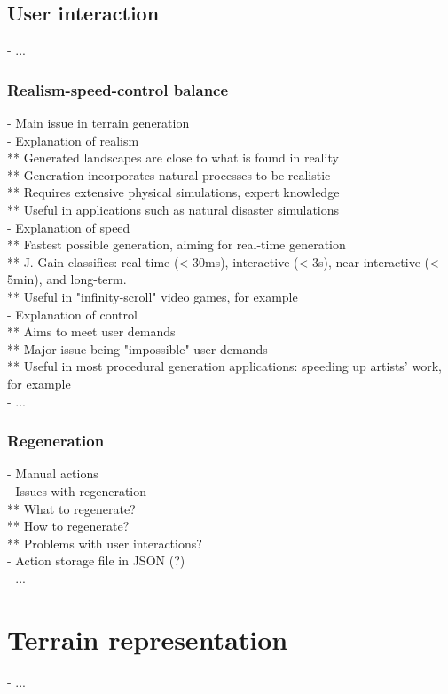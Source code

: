 \subsection{User interaction}
- ...

\subsubsection{Realism-speed-control balance}
- Main issue in terrain generation \\
- Explanation of realism \\
** Generated landscapes are close to what is found in reality \\
** Generation incorporates natural processes to be realistic \\
** Requires extensive physical simulations, expert knowledge \\
** Useful in applications such as natural disaster simulations \\
- Explanation of speed \\
** Fastest possible generation, aiming for real-time generation \\
** J. Gain classifies: real-time (< 30ms), interactive (< 3s), near-interactive (< 5min), and long-term. \\
** Useful in "infinity-scroll" video games, for example \\
- Explanation of control \\
** Aims to meet user demands \\
** Major issue being "impossible" user demands \\
** Useful in most procedural generation applications: speeding up artists' work, for example \\
- ...

\subsubsection{Regeneration}
- Manual actions \\
- Issues with regeneration \\
** What to regenerate? \\
** How to regenerate? \\
** Problems with user interactions? \\
- Action storage file in JSON (?) \\
- ...

\section{Terrain representation}
\label{sec:state-of-the-art_terrain-representations}
- ...

